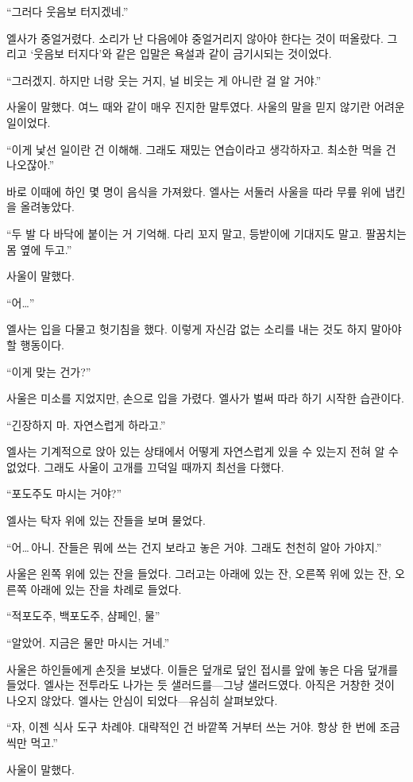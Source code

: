 ``그러다 웃음보 터지겠네.''

엘사가 중얼거렸다. 소리가 난 다음에야 중얼거리지 않아야 한다는 것이 떠올랐다. 그리고 `웃음보 터지다'와 같은 입말은 욕설과 같이 금기시되는 것이었다.

``그러겠지. 하지만 너랑 웃는 거지, 널 비웃는 게 아니란 걸 알 거야.''

사울이 말했다. 여느 때와 같이 매우 진지한 말투였다. 사울의 말을 믿지 않기란 어려운 일이었다.

``이게 낯선 일이란 건 이해해. 그래도 재밌는 연습이라고 생각하자고. 최소한 먹을 건 나오잖아.''

바로 이때에 하인 몇 명이 음식을 가져왔다. 엘사는 서둘러 사울을 따라 무릎 위에 냅킨을 올려놓았다.

``두 발 다 바닥에 붙이는 거 기억해. 다리 꼬지 말고, 등받이에 기대지도 말고. 팔꿈치는 몸 옆에 두고.''

사울이 말했다.

``어\ldots''

엘사는 입을 다물고 헛기침을 했다. 이렇게 자신감 없는 소리를 내는 것도 하지 말아야 할 행동이다.

``이게 맞는 건가?''

사울은 미소를 지었지만, 손으로 입을 가렸다. 엘사가 벌써 따라 하기 시작한 습관이다.

``긴장하지 마. 자연스럽게 하라고.''

엘사는 기계적으로 앉아 있는 상태에서 어떻게 자연스럽게 있을 수 있는지 전혀 알 수 없었다. 그래도 사울이 고개를 끄덕일 때까지 최선을 다했다.

``포도주도 마시는 거야?''

엘사는 탁자 위에 있는 잔들을 보며 물었다.

``어\ldots\,아니. 잔들은 뭐에 쓰는 건지 보라고 놓은 거야. 그래도 천천히 알아 가야지.''

사울은 왼쪽 위에 있는 잔을 들었다. 그러고는 아래에 있는 잔, 오른쪽 위에 있는 잔, 오른쪽 아래에 있는 잔을 차례로 들었다.

``적포도주, 백포도주, 샴페인, 물''

``알았어. 지금은 물만 마시는 거네.''

사울은 하인들에게 손짓을 보냈다. 이들은 덮개로 덮인 접시를 앞에 놓은 다음 덮개를 들었다. 엘사는 전투라도 나가는 듯 샐러드를—그냥 샐러드였다. 아직은 거창한 것이 나오지 않았다. 엘사는 안심이 되었다—유심히 살펴보았다.

``자, 이젠 식사 도구 차례야. 대략적인 건 바깥쪽 거부터 쓰는 거야. 항상 한 번에 조금씩만 먹고.''

사울이 말했다.


